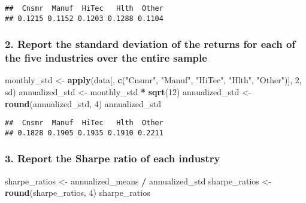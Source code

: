 \documentclass[
]{article}
\newenvironment{Shaded}{\begin{snugshade}}{\end{snugshade}}
\newcommand{\DecValTok}[1]{\textcolor[rgb]{0.00,0.00,0.81}{#1}}
\newcommand{\FunctionTok}[1]{\textcolor[rgb]{0.13,0.29,0.53}{\textbf{#1}}}
\newcommand{\NormalTok}[1]{#1}
\newcommand{\OtherTok}[1]{\textcolor[rgb]{0.56,0.35,0.01}{#1}}
\newcommand{\SpecialCharTok}[1]{\textcolor[rgb]{0.81,0.36,0.00}{\textbf{#1}}}
\newcommand{\StringTok}[1]{\textcolor[rgb]{0.31,0.60,0.02}{#1}}
\begin{document}
\begin{verbatim}
##  Cnsmr  Manuf  HiTec   Hlth  Other 
## 0.1215 0.1152 0.1203 0.1288 0.1104
\end{verbatim}

\hypertarget{report-the-standard-deviation-of-the-returns-for-each-of-the-five-industries-over-the-entire-sample}{%
\subsubsection{2. Report the standard deviation of the returns for each
of the five industries over the entire
sample}\label{report-the-standard-deviation-of-the-returns-for-each-of-the-five-industries-over-the-entire-sample}}

\begin{Shaded}
\begin{Highlighting}[]
\NormalTok{monthly\_std }\OtherTok{\textless{}{-}} \FunctionTok{apply}\NormalTok{(data[, }\FunctionTok{c}\NormalTok{(}\StringTok{"Cnsmr"}\NormalTok{, }\StringTok{"Manuf"}\NormalTok{, }\StringTok{"HiTec"}\NormalTok{, }\StringTok{"Hlth"}\NormalTok{, }\StringTok{"Other"}\NormalTok{)], }\DecValTok{2}\NormalTok{, sd)}
\NormalTok{annualized\_std }\OtherTok{\textless{}{-}}\NormalTok{ monthly\_std }\SpecialCharTok{*} \FunctionTok{sqrt}\NormalTok{(}\DecValTok{12}\NormalTok{)}
\NormalTok{annualized\_std }\OtherTok{\textless{}{-}} \FunctionTok{round}\NormalTok{(annualized\_std, }\DecValTok{4}\NormalTok{)}
\NormalTok{annualized\_std}
\end{Highlighting}
\end{Shaded}

\begin{verbatim}
##  Cnsmr  Manuf  HiTec   Hlth  Other 
## 0.1828 0.1905 0.1935 0.1910 0.2211
\end{verbatim}

\hypertarget{report-the-sharpe-ratio-of-each-industry}{%
\subsubsection{3. Report the Sharpe ratio of each
industry}\label{report-the-sharpe-ratio-of-each-industry}}

\begin{Shaded}
\begin{Highlighting}[]
\NormalTok{sharpe\_ratios }\OtherTok{\textless{}{-}}\NormalTok{ annualized\_means }\SpecialCharTok{/}\NormalTok{ annualized\_std}
\NormalTok{sharpe\_ratios }\OtherTok{\textless{}{-}} \FunctionTok{round}\NormalTok{(sharpe\_ratios, }\DecValTok{4}\NormalTok{)}
\NormalTok{sharpe\_ratios}
\end{Highlighting}
\end{Shaded}
\end{document}
